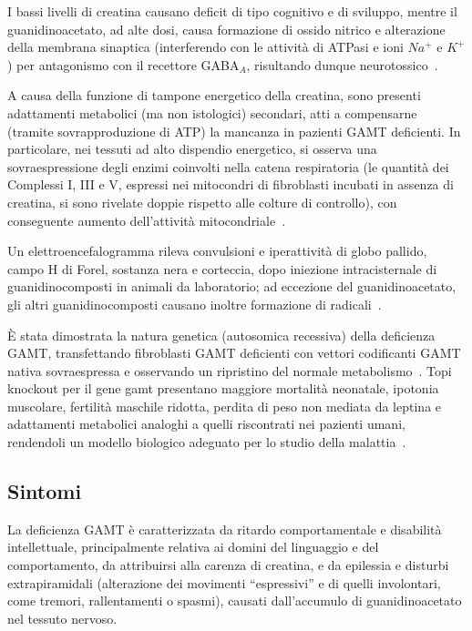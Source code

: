 		I bassi livelli di creatina causano deficit di tipo cognitivo e di sviluppo, mentre il guanidinoacetato, ad alte dosi, causa formazione di ossido nitrico e alterazione della membrana sinaptica (interferendo con le attivit\`a di ATPasi e ioni $Na^+$ e $K^+$) per antagonismo con il recettore GABA$_A$, risultando dunque neurotossico~\cite{gordon2010guanidinoacetate}.
		
		A causa della funzione di tampone energetico della creatina, sono presenti adattamenti metabolici (ma non istologici) secondari, atti a compensarne (tramite sovrapproduzione di ATP) la mancanza in pazienti GAMT deficienti.
		In particolare, nei tessuti ad alto dispendio energetico, si osserva una sovraespressione degli enzimi coinvolti nella catena respiratoria (le quantit\`a dei Complessi I, III e V, espressi nei mitocondri di fibroblasti incubati in assenza di creatina, si sono rivelate doppie rispetto alle colture di controllo), con conseguente aumento dell'attivit\`a mitocondriale~\cite{das2000upregulation}.
		
		Un elettroencefalogramma rileva convulsioni e iperattivit\`a di globo pallido, campo H di Forel, sostanza nera e corteccia, dopo iniezione intracisternale di guanidinocomposti in animali da laboratorio; ad eccezione del guanidinoacetato, gli altri guanidinocomposti causano inoltre formazione di radicali~\cite{mori1987biochemistry}.
		
		\`E stata dimostrata la natura genetica (autosomica recessiva) della deficienza GAMT, transfettando fibroblasti GAMT deficienti con vettori codificanti GAMT nativa sovraespressa e osservando un ripristino del normale metabolismo~\cite{almeida2006overexpression}.
		Topi knockout per il gene gamt presentano maggiore mortalit\`a neonatale, ipotonia muscolare, fertilit\`a maschile ridotta, perdita di peso non mediata da leptina e adattamenti metabolici analoghi a quelli riscontrati nei pazienti umani, rendendoli un modello biologico adeguato per lo studio della malattia~\cite{schmidt2004severely}.
		
		\subsection{Sintomi}
		La deficienza GAMT \`e caratterizzata da ritardo comportamentale e disabilit\`a intellettuale, principalmente relativa ai domini del linguaggio e del comportamento, da attribuirsi alla carenza di creatina, e da epilessia e disturbi extrapiramidali (alterazione dei movimenti ``espressivi'' e di quelli involontari, come tremori, rallentamenti o spasmi), causati dall'accumulo di guanidinoacetato nel tessuto nervoso.
		
